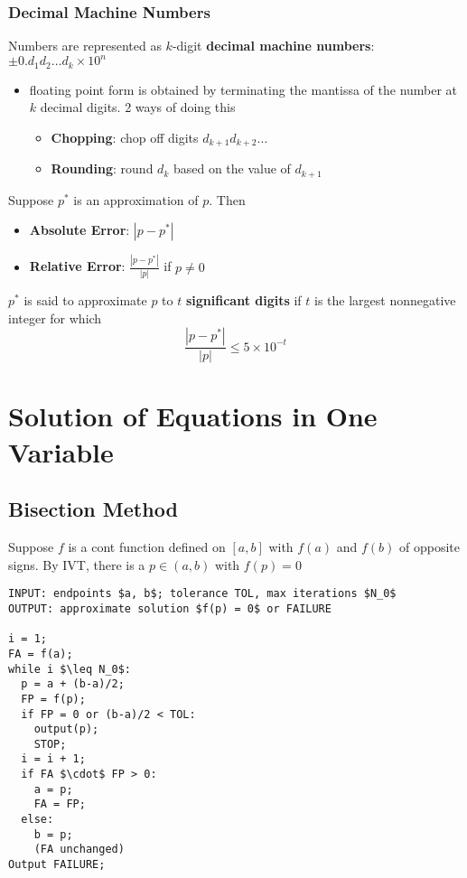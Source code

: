 \documentclass{article}
\begin{document}
  \subsubsection{Decimal Machine Numbers}
  Numbers are represented as $k$-digit \textbf{decimal machine numbers}: $\pm 0. d_1d_2\ldots d_k \times 10^n$
  \begin{itemize}
    \item floating point form is obtained by terminating the mantissa of the number at $k$ decimal digits. 2 ways of doing this
      \begin{itemize}
        \item \textbf{Chopping}: chop off digits $d_{k+1}d_{k+2} \ldots$
        \item \textbf{Rounding}: round $d_k$ based on the value of $d_{k+1}$
      \end{itemize}
  \end{itemize}
  Suppose $p^*$ is an approximation of $p$. Then
  \begin{itemize}
  \item \textbf{Absolute Error}: $|p - p^*|$
  \item \textbf{Relative Error}: $\frac{|p - p^*|}{|p|}$ if $p \neq 0$
  \end{itemize}
  $p^*$ is said to approximate $p$ to $t$ \textbf{significant digits} if $t$ is the largest nonnegative integer for which
\[\frac{|p - p^*|}{|p|} \leq 5 \times 10^{-t}\]
\section{Solution of Equations in One Variable}
\subsection{Bisection Method}
Suppose $f$ is a cont function defined on $[a,b]$ with $f(a)$ and $f(b)$ of opposite signs. By IVT, there is a $p \in (a,b)$ with $f(p) = 0$

\begin{lstlisting}
INPUT: endpoints $a, b$; tolerance TOL, max iterations $N_0$
OUTPUT: approximate solution $f(p) = 0$ or FAILURE

i = 1;
FA = f(a);
while i $\leq N_0$:
  p = a + (b-a)/2; 
  FP = f(p);
  if FP = 0 or (b-a)/2 < TOL:
    output(p);
    STOP;
  i = i + 1;
  if FA $\cdot$ FP > 0:
    a = p;
    FA = FP;
  else:
    b = p;
    (FA unchanged)
Output FAILURE;
\end{lstlisting}
\end{document}
